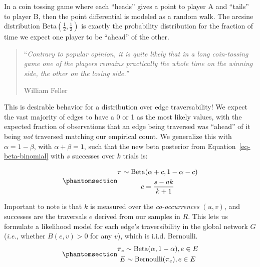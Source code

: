 \documentclass[%
	12pt,
		oneside,
		letterpaper
]{book}
\begin{document}
In a coin tossing game where each ``heads'' gives a point to player A and ``tails'' to player B, then the point differential is modeled as a random walk.
The arcsine distribution \(\text{Beta}(\tfrac{1}{2},\tfrac{1}{2})\) is exactly the probability distribution for the fraction of time we expect one player to be ``ahead'' of the other. \autocite{WhatisArcsine_Ackelsberg2018}

\begin{quote}
``\emph{Contrary to popular opinion, it is quite likely that in a long coin-tossing game one of the players remains practically the whole time on the winning side, the other on the losing side.''}

William Feller\autocite[Chapter III]{IntroductionProbabilityTheory_Feller1968}
\end{quote}

This is desirable behavior for a distribution over edge traversability!
We expect the vast majority of edges to have a 0 or 1 as the most likely values, with the expected fraction of observations that an edge being traversed was ``ahead'' of it being \emph{not} traversed matching our empirical count.
We generalize this with \(\alpha = 1-\beta\), with \(\alpha + \beta = 1\), such that the new beta posterior from Equation~\ref{eq-beta-binomial} with \(s\) successes over \(k\) trials is:

\begin{equation}\phantomsection\label{eq-desirepath-binom}{
\begin{gathered}
\pi \sim \text{Beta}(\alpha + c, 1-\alpha-c) \\
c = \frac{s-ak}{k+1}\\
\end{gathered}
}\end{equation}

Important to note is that \(k\) is measured over the \emph{co-occurrences} \((u,v)\), and successes are the traversals \(e\) derived from our samples in \(R\).
This lets us formulate a likelihood model for each edge's traversibility in the global network \(G\) (\emph{i.e.}, whether \(B(e,v)>0\) for any \(v\)), which is i.i.d. Bernoulli.
\begin{equation}\phantomsection\label{eq-empirical-model}{
\begin{gathered}
\pi_e \sim \text{Beta}(\alpha, 1-\alpha), e\in E\\ 
E \sim \text{Bernoulli}(\pi_e), e \in E
\end{gathered}
}\end{equation}
\end{document}
